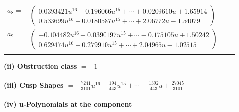 \documentclass[1p]{elsarticle_modified}
\theoremstyle{definition}
\begin{document}
\begin{tabular}{m{7pt} m{180pt} m{7pt} m{180pt} }
\flushright $a_{8}=$&$\begin{pmatrix}0.0393421 u^{16}+0.196066 u^{15}+\cdots+0.0209610 u+1.65914\\0.533699 u^{16}+0.0180587 u^{15}+\cdots+2.06772 u-1.54079\end{pmatrix}$ \\
\flushright $a_{9}=$&$\begin{pmatrix}-0.104482 u^{16}+0.0390197 u^{15}+\cdots-0.175105 u+1.50242\\0.629474 u^{16}+0.279910 u^{15}+\cdots+2.04966 u-1.02515\end{pmatrix}$\\&\end{tabular}
\flushleft \textbf{(ii) Obstruction class $= -1$}\\~\\
\flushleft \textbf{(iii) Cusp Shapes $= -\frac{7241}{3101} u^{16}-\frac{194}{443} u^{15}+\cdots-\frac{1392}{443} u+\frac{27045}{3101}$}\\~\\
\newpage\renewcommand{\arraystretch}{1}
\flushleft \textbf{(iv) u-Polynomials at the component}\newline \\
\end{document}

